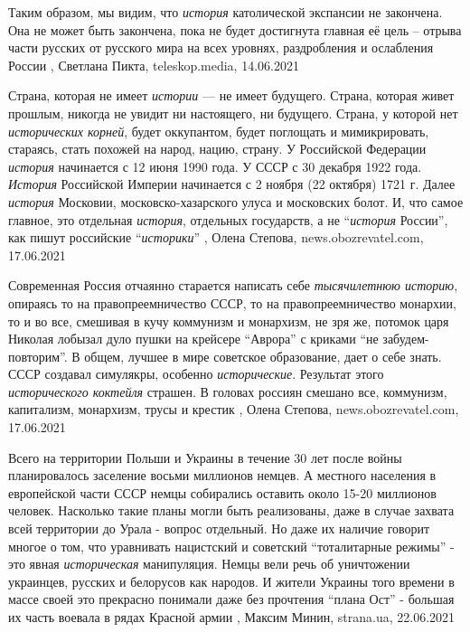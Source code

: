 Таким образом, мы видим, что \emph{история} католической экспансии не закончена. Она
не может быть закончена, пока не будет достигнута главная её цель – отрыва
части русских от русского мира на всех уровнях, раздробления и ослабления
России 
, 
Светлана Пикта, teleskop.media, 14.06.2021

Страна, которая не имеет \emph{истории} — не имеет будущего. Страна, которая живет
прошлым, никогда не увидит ни настоящего, ни будущего. Страна, у которой нет
\emph{исторических корней}, будет оккупантом, будет поглощать и мимикрировать,
стараясь, стать похожей на народ, нацию, страну.  У Российской Федерации
\emph{история} начинается с 12 июня 1990 года. У СССР с 30 декабря 1922 года. \emph{История}
Российской Империи начинается с 2 ноября (22 октября) 1721 г. Далее \emph{история}
Московии, московско-хазарского улуса и московских болот. И, что самое главное,
это отдельная \emph{история}, отдельных государств, а не \enquote{\emph{история} России}, как пишут
российские \enquote{\emph{историки}}
, 
Олена Степова, news.obozrevatel.com, 17.06.2021

Современная Россия отчаянно старается написать себе \emph{тысячилетнюю историю},
опираясь то на правопреемничество СССР, то на правопреемничество монархии, то и
во все, смешивая в кучу коммунизм и монархизм, не зря же, потомок царя Николая
лобызал дуло пушки на крейсере \enquote{Аврора} с криками \enquote{не забудем-повторим}. В
общем, лучшее в мире советское образование, дает о себе знать. СССР создавал
симулякры, особенно \emph{исторические}. Результат этого \emph{исторического коктейля}
страшен. В головах россиян смешано все, коммунизм, капитализм, монархизм, трусы
и крестик
, 
Олена Степова, news.obozrevatel.com, 17.06.2021

Всего на территории Польши и Украины в течение 30 лет после войны планировалось
заселение восьми миллионов немцев. А местного населения в европейской части
СССР немцы собирались оставить около 15-20 миллионов человек.  Насколько такие
планы могли быть реализованы, даже в случае захвата всей территории до Урала -
вопрос отдельный.  Но даже их наличие говорит многое о том, что уравнивать
нацистский и советский \enquote{тоталитарные режимы} - это явная
\emph{историческая} манипуляция. Немцы вели речь об уничтожении украинцев,
русских и белорусов как народов. И жители Украины того времени в массе своей
это прекрасно понимали даже без прочтения \enquote{плана Ост} - большая их
часть воевала в рядах Красной армии
  , Максим Минин, strana.ua, 22.06.2021

